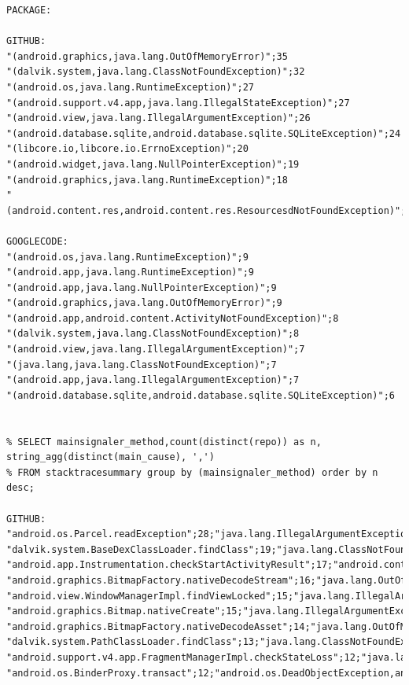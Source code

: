 \documentclass[conference]{IEEEtran}
\begin{document}
{\begin{verbatim}
PACKAGE:

GITHUB:
"(android.graphics,java.lang.OutOfMemoryError)";35
"(dalvik.system,java.lang.ClassNotFoundException)";32
"(android.os,java.lang.RuntimeException)";27
"(android.support.v4.app,java.lang.IllegalStateException)";27
"(android.view,java.lang.IllegalArgumentException)";26
"(android.database.sqlite,android.database.sqlite.SQLiteException)";24
"(libcore.io,libcore.io.ErrnoException)";20
"(android.widget,java.lang.NullPointerException)";19
"(android.graphics,java.lang.RuntimeException)";18
"(android.content.res,android.content.res.ResourcesdNotFoundException)";18

GOOGLECODE:
"(android.os,java.lang.RuntimeException)";9
"(android.app,java.lang.RuntimeException)";9
"(android.app,java.lang.NullPointerException)";9
"(android.graphics,java.lang.OutOfMemoryError)";9
"(android.app,android.content.ActivityNotFoundException)";8
"(dalvik.system,java.lang.ClassNotFoundException)";8
"(android.view,java.lang.IllegalArgumentException)";7
"(java.lang,java.lang.ClassNotFoundException)";7
"(android.app,java.lang.IllegalArgumentException)";7
"(android.database.sqlite,android.database.sqlite.SQLiteException)";6


% SELECT mainsignaler_method,count(distinct(repo)) as n, string_agg(distinct(main_cause), ',')
% FROM stacktracesummary group by (mainsignaler_method) order by n desc;

GITHUB:
"android.os.Parcel.readException";28;"java.lang.IllegalArgumentException,java.lang.IllegalStateException,java.lang.NullPointerException,java.lang.SecurityException"
"dalvik.system.BaseDexClassLoader.findClass";19;"java.lang.ClassNotFoundException"
"android.app.Instrumentation.checkStartActivityResult";17;"android.content.ActivityNotFoundException"
"android.graphics.BitmapFactory.nativeDecodeStream";16;"java.lang.OutOfMemoryError"
"android.view.WindowManagerImpl.findViewLocked";15;"java.lang.IllegalArgumentException"
"android.graphics.Bitmap.nativeCreate";15;"java.lang.IllegalArgumentException,java.lang.OutOfMemoryError"
"android.graphics.BitmapFactory.nativeDecodeAsset";14;"java.lang.OutOfMemoryError,java.lang.RuntimeException"
"dalvik.system.PathClassLoader.findClass";13;"java.lang.ClassNotFoundException"
"android.support.v4.app.FragmentManagerImpl.checkStateLoss";12;"java.lang.IllegalStateException"
"android.os.BinderProxy.transact";12;"android.os.DeadObjectException,android.os.TransactionTooLargeException,java.lang.RuntimeException"



\end{verbatim}}
\end{document}
